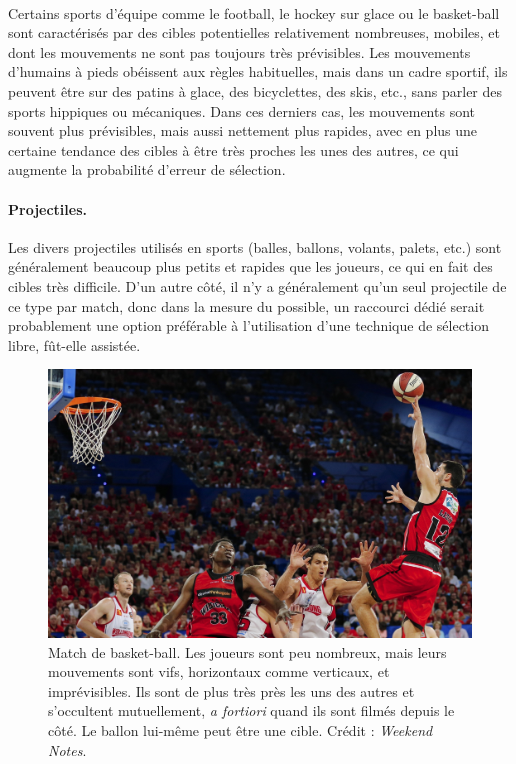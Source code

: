 	\paragraph*{}
	Certains sports d'équipe comme le football, le hockey sur glace ou le basket-ball sont caractérisés par des cibles potentielles relativement nombreuses, mobiles, et dont les mouvements ne sont pas toujours très prévisibles. Les mouvements d'humains à pieds obéissent aux règles habituelles, mais dans un cadre sportif, ils peuvent être sur des patins à glace, des bicyclettes, des skis, etc., sans parler des sports hippiques ou mécaniques. Dans ces derniers cas, les mouvements sont souvent plus prévisibles, mais aussi nettement plus rapides, avec en plus une certaine tendance des cibles à être très proches les unes des autres, ce qui augmente la probabilité d'erreur de sélection.
	
	\paragraph{Projectiles.}
	Les divers projectiles utilisés en sports (balles, ballons, volants, palets, etc.) sont généralement beaucoup plus petits et rapides que les joueurs, ce qui en fait des cibles très difficile. D'un autre côté, il n'y a généralement qu'un seul projectile de ce type par match, donc dans la mesure du possible, un raccourci dédié serait probablement une option préférable à l'utilisation d'une technique de sélection libre, fût-elle assistée.
	
	\begin{figure}[ht]
		\centering
		\includegraphics[width=\textwidth]{figures/ch1/basket}
		\caption{Match de basket-ball. Les joueurs sont peu nombreux, mais leurs mouvements sont vifs, horizontaux comme verticaux, et imprévisibles. Ils sont de plus très près les uns des autres et s'occultent mutuellement, \emph{a fortiori} quand ils sont filmés depuis le côté. Le ballon lui-même peut être une cible. Crédit : \emph{Weekend Notes}.}
		\label{fig:basketball}
	\end{figure}
	

